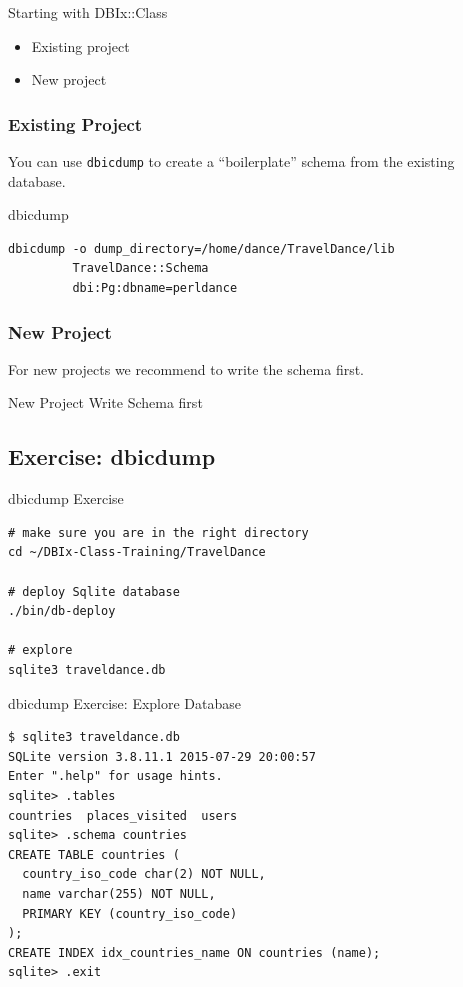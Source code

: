 \begin{frame}{Starting with DBIx::Class}
\begin{itemize}
\item Existing project
\item New project
\end{itemize}
\end{frame}

\subsubsection{Existing Project}

You can use \verb|dbicdump| to create a ``boilerplate'' schema from the
existing database.

\begin{frame}[fragile]{dbicdump}
\begin{lstlisting}
dbicdump -o dump_directory=/home/dance/TravelDance/lib 
         TravelDance::Schema 
         dbi:Pg:dbname=perldance
\end{lstlisting}
\end{frame}

\subsubsection{New Project}

For new projects we recommend to write the schema first.

\begin{frame}[fragile]{New Project}
Write Schema first
\end{frame}

\subsection{Exercise: dbicdump}
\begin{frame}[fragile]{dbicdump Exercise}
\begin{lstlisting}
# make sure you are in the right directory
cd ~/DBIx-Class-Training/TravelDance

# deploy Sqlite database
./bin/db-deploy

# explore
sqlite3 traveldance.db
\end{lstlisting}
\end{frame}

\begin{frame}[fragile]{dbicdump Exercise: Explore Database}
\begin{lstlisting}
$ sqlite3 traveldance.db
SQLite version 3.8.11.1 2015-07-29 20:00:57
Enter ".help" for usage hints.
sqlite> .tables
countries  places_visited  users
sqlite> .schema countries
CREATE TABLE countries (
  country_iso_code char(2) NOT NULL,
  name varchar(255) NOT NULL,
  PRIMARY KEY (country_iso_code)
);
CREATE INDEX idx_countries_name ON countries (name);
sqlite> .exit
\end{lstlisting}
\end{frame}

